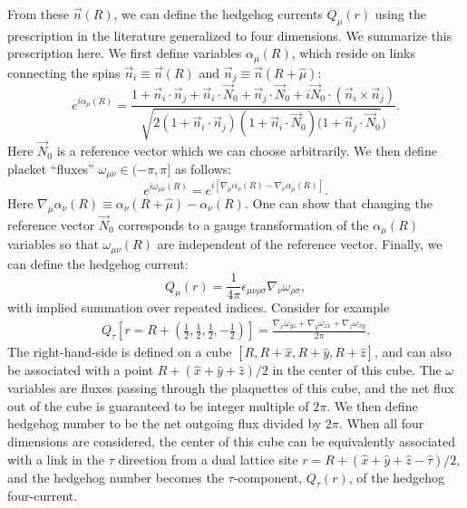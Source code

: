 From these $\vec{n}(R)$, we can define the hedgehog currents $Q_\mu(r)$ using the prescription in the literature\cite{KamalMurthy,LauDasgupta,SachdevHedgehogs,LesikAshvin} generalized to four dimensions. We summarize this prescription here. We first define variables $\alpha_\mu(R)$, which reside on links connecting the spins $\vec{n}_i\equiv\vec n(R)$ and $\vec{n}_j\equiv\vec n(R+\hat\mu)$:
\begin{equation}
e^{i\alpha_{\mu}(R)}=\frac{1+\vec{n}_i\cdot\vec{n}_j+\vec{n}_i\cdot\vec{N}_0+\vec{n}_j\cdot\vec{N}_0+i\vec{N}_0 \cdot(\vec{n}_i\times\vec{n}_j)}{\sqrt{2(1+\vec{n}_i\cdot\vec{n}_j)(1+\vec{n}_i\cdot\vec{N}_0)(1+\vec{n}_j\cdot\vec{N}_0})}.
\label{alpha}
\end{equation}
Here $\vec{N}_0$ is a reference vector which we can choose arbitrarily. 
We then define placket ``fluxes'' $\omega_{\mu\nu}\in (-\pi,\pi]$ as follows:
\begin{equation}
e^{i \omega_{\mu\nu}(R)} = 
e^{i [\nabla_\mu\alpha_\nu(R)-\nabla_\nu\alpha_\mu(R)]}.
\label{omega}
\end{equation}
Here $\nabla_\mu \alpha_\nu(R)\equiv \alpha_\nu(R+\hat{\mu})-\alpha_\nu(R)$. One can show that changing the reference vector $\vec{N}_0$ corresponds to a gauge transformation of the $\alpha_\mu(R)$ variables so that $\omega_{\mu\nu}(R)$ are independent of the reference vector. Finally, we can define the hedgehog current:
\begin{equation}
Q_\mu(r)=\frac{1}{4\pi}\epsilon_{\mu\nu\rho\sigma}\nabla_{\nu} \omega_{\rho\sigma},
\label{monopoledef}
\end{equation}
with implied summation over repeated indices.
Consider for example 
\begin{eqnarray}
Q_\tau[r=R+(\frac{1}{2},\frac{1}{2},\frac{1}{2},-\frac{1}{2})]=\frac{\nabla_x\omega_{yz}+\nabla_y\omega_{zx}+\nabla_z\omega_{xy}}{2\pi}. \nonumber
\end{eqnarray}
The right-hand-side is defined on a cube $[R, R+\hat{x}, R+\hat{y}, R+\hat{z}]$, and can also be associated with a point $R + (\hat{x} + \hat{y} + \hat{z})/2$ in the center of this cube.
The $\omega$ variables are fluxes passing through the plaquettes of this cube, and the net flux out of the cube is guaranteed to be integer multiple of $2\pi$.  We then define hedgehog number to be the net outgoing flux divided by $2\pi$.
When all four dimensions are considered, the center of this cube can be equivalently associated with a link in the $\tau$ direction from a dual lattice site $r = R + (\hat{x} + \hat{y} + \hat{z} - \hat{\tau})/2$, and the hedgehog number becomes the $\tau$-component, $Q_\tau(r)$, of the hedgehog four-current.

